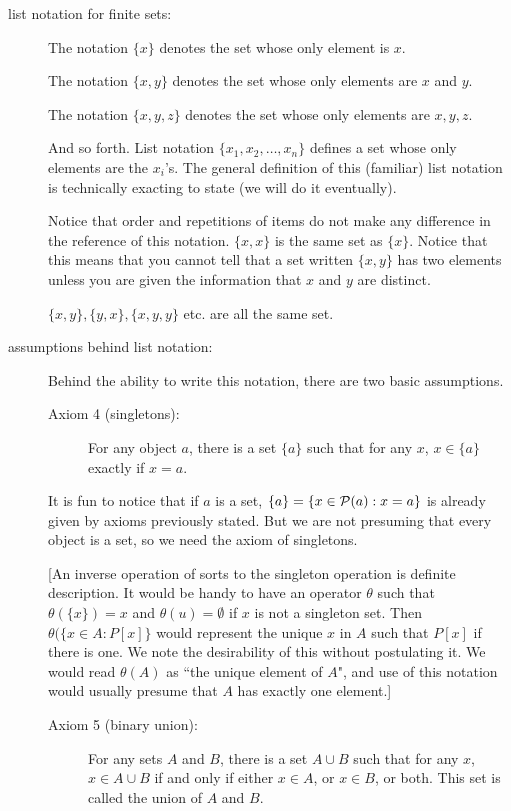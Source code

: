 \documentclass[12pt]{article}
\begin{document}
\begin{description}
\item[list notation for finite sets:]  The notation $\{x\}$ denotes the set whose only element is $x$.

The notation $\{x,y\}$ denotes the set whose only elements are $x$ and $y$.

The notation $\{x,y,z\}$ denotes the set whose only elements are $x,y,z$.

And so forth.  List notation $\{x_1,x_2,\ldots,x_n\}$ defines a set whose only elements are the $x_i$'s.
The general definition of this (familiar) list notation is technically exacting to state (we will do it eventually).

Notice that order and repetitions of items do not make any difference in the reference of this notation.
$\{x,x\}$ is the same set as $\{x\}$.  Notice that this means that you cannot tell that a set written $\{x,y\}$ has two elements unless you are given the information that $x$ and $y$ are distinct.

$\{x,y\}, \{y,x\}, \{x,y,y\}$ etc. are all the same set.

\item[assumptions behind list notation:]

Behind the ability to write this notation, there are two basic assumptions.

\begin{description}

\item[Axiom 4 (singletons):]  For any object $a$, there is a set $\{a\}$ such that for any $x$, $x \in \{a\}$ exactly if $x=a$.

\end{description}

It is fun to notice that if $a$ is a set, $\{a\} = \{x \in {\cal P}(a):x=a\}$ is already given by axioms previously stated.
But we are not presuming that every object is a set, so we need the axiom of singletons.

[An inverse operation of sorts to the singleton operation is definite description.  It would be handy to have an operator
$\theta$ such that $\theta(\{x\}) = x$ and $\theta(u) = \emptyset$ if $x$ is not a singleton set.  Then $\theta(\{x \in A:P[x]\}$ would represent the unique $x$ in $A$ such that $P[x]$ if there is one.   We note the desirability of this without postulating it.  We would read $\theta(A)$ as ``the unique element of $A$", and use of this notation would usually presume
that $A$ has exactly one element.]

\begin{description}
\item[Axiom 5 (binary union):]  For any sets $A$ and $B$, there is a set $A \cup B$ such that for any $x$, $x \in A \cup B$ if and only if 
either $x \in A$, or $x \in B$, or both.  This set is called the union of $A$ and $B$.
\end{description}


\end{description}
\end{document}
